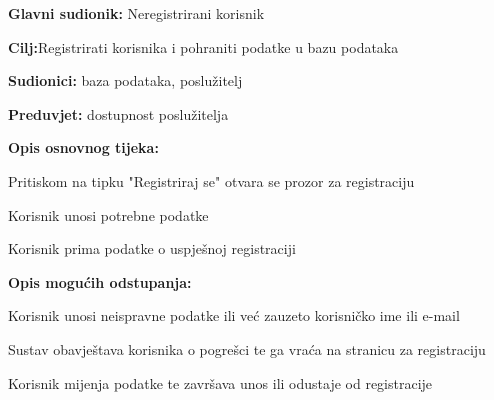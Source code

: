 \noindent {}
\begin{packed_item}

	\item \textbf{Glavni sudionik: }Neregistrirani korisnik
	\item  \textbf{Cilj:}Registrirati korisnika i pohraniti podatke u bazu podataka
	\item  \textbf{Sudionici:} baza podataka, poslužitelj
	\item  \textbf{Preduvjet:} dostupnost poslužitelja
	\item  \textbf{Opis osnovnog tijeka:}

	\item[] \begin{packed_enum}

				\item Pritiskom na tipku "Registriraj se" otvara se prozor za registraciju
				\item Korisnik unosi potrebne podatke
				\item Korisnik prima podatke o uspješnoj registraciji

	\end{packed_enum}

	\item  \textbf{Opis mogućih odstupanja:}

	\item[] \begin{packed_item}

				\item[2.a]Korisnik unosi neispravne podatke ili već zauzeto korisničko ime ili e-mail
				\item[] \begin{packed_enum}

							\item Sustav obavještava korisnika o pogrešci te ga vraća na stranicu za registraciju
							\item Korisnik mijenja podatke te završava unos ili odustaje od registracije

				\end{packed_enum}

	\end{packed_item}
\end{packed_item}

